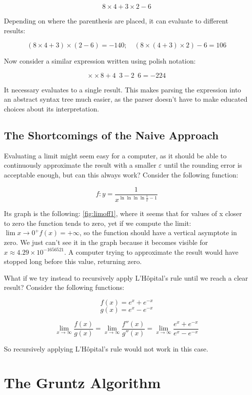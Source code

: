 \documentclass{article}
\theoremstyle{plain}
\theoremstyle{definition}
\begin{document}
	\[
	8 \times 4 + 3 \times  2 - 6
	\]
	
	Depending on where the parenthesis are placed, it can evaluate to different results:
	
	\[
	(8 \times 4 + 3) \times (2 - 6) = -140; \quad (8 \times (4 + 3) \times 2) - 6 = 106 
	\]
	
	Now consider a similar expression written using polish notation:
	
	\[
	\times \times 8 + 4 \enspace 3 - 2 \enspace 6 = -224
	\]
	
	It necessary evaluates to a single result.
	This makes parsing the expression into an abstract syntax tree much easier, as the parser doesn't have to make educated choices about its interpretation.
	
	\subsection{The Shortcomings of the Naive Approach}
	
	Evaluating a limit might seem easy for a computer, as it should be able to continuously approximate the result with a smaller $\varepsilon$ until the rounding error is acceptable enough, but can this always work?
	Consider the following function:
	
	\[
	f : y = \frac{1}{x^{\ln{\ln{\ln{\ln{\frac{1}{x}}}}}-1}} \tag{1.3} \label{eq:toinfinity}
	\]
	
	Its graph is the following: \cref{fig:limoff1}, where it seems that for values of x closer to zero the function tends to zero, yet if we compute the limit: \(\lim{x \to 0^{+}}{f(x) = +\infty}\), so the function should have a vertical asymptote in zero. We just can't see it in the graph because it becomes visible for \(x \approx 4.29 \times 10 ^{-1656521}\). A computer trying to approximate the result would have stopped long before this value, returning zero.
	
	What if we try instead to recursively apply L'Hôpital's rule \cite{wiki:hopital} until we reach a clear result?
	Consider the following functions:
	
	\[
	f(x) = e^{x} + e^{-x}
	\] 
	\[
	g(x) = e^{x} - e^{-x}
	\]
	
	\[
	\lim_{x \to \infty}{\frac{f(x)}{g(x)}} = \lim_{x \to \infty}{\frac{f''(x)}{g''(x)}} = \lim_{x \to \infty}{\frac{e^{x} + e^{-x}}{e^{x} - e^{-x}}}
	\]
	
	So recursively applying L'Hôpital's rule would not work in this case.
	
	\section{The Gruntz Algorithm}
	
\end{document}
